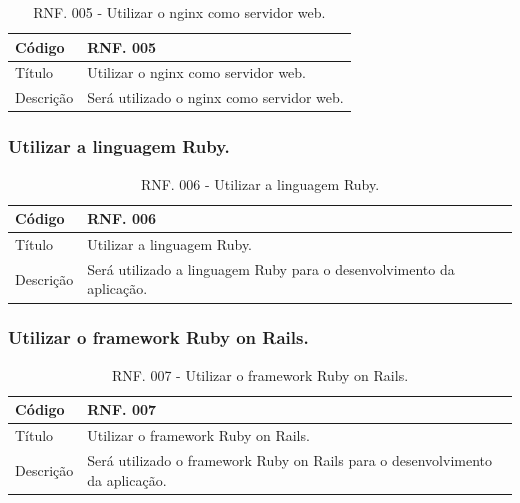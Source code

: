 \documentclass[11pt]{article}
\begin{document}
        \begin{table}[h]
          \begin{center}
            \begin{tabular}{ | p{5cm} | p{10cm} | }
              \hline
              Código\cellcolor{gray} & RNF. 005\cellcolor{gray} \\
              \hline
              Título & Utilizar o nginx como servidor web. \\
              \hline
              Descrição & Será utilizado o nginx como servidor web. \\
              \hline
            \end{tabular}
            \caption{RNF. 005 - Utilizar o nginx como servidor web.}
          \end{center}
        \end{table}

    \clearpage

      \subsubsection{Utilizar a linguagem Ruby.}

        \begin{table}[h]
          \begin{center}
            \begin{tabular}{ | p{5cm} | p{10cm} | }
              \hline
              Código\cellcolor{gray} & RNF. 006\cellcolor{gray} \\
              \hline
              Título & Utilizar a linguagem Ruby. \\
              \hline
              Descrição & Será utilizado a linguagem Ruby para o desenvolvimento da aplicação. \\
              \hline
            \end{tabular}
            \caption{RNF. 006 - Utilizar a linguagem Ruby.}
          \end{center}
        \end{table}
        
      \subsubsection{Utilizar o framework Ruby on Rails.}

        \begin{table}[h]
          \begin{center}
            \begin{tabular}{ | p{5cm} | p{10cm} | }
              \hline
              Código\cellcolor{gray} & RNF. 007\cellcolor{gray} \\
              \hline
              Título & Utilizar o framework Ruby on Rails. \\
              \hline
              Descrição & Será utilizado o framework Ruby on Rails para o desenvolvimento da aplicação. \\
              \hline
            \end{tabular}
            \caption{RNF. 007 - Utilizar o framework Ruby on Rails.}
          \end{center}
        \end{table}
\end{document}
